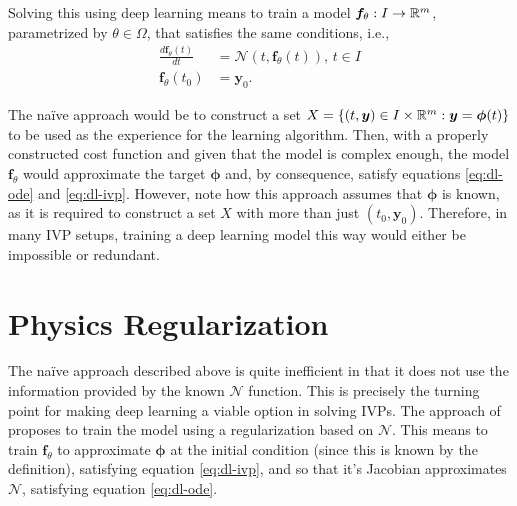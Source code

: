 Solving this using deep learning means to train a model $\bm{f}_{\theta}:I\to \mathbb{R}^{m}$, parametrized by $\theta\in \Omega$, that satisfies the same conditions, i.e.,
\begin{align}
    \frac{d \bm{f}_\theta(t)}{d t} &= \mathcal{N}\left( t, \bm{f}_\theta(t) \right),\,t\in I \label{eq:dl-ode} \\
    \bm{f}_\theta(t_0) &= \bm{y}_0 \label{eq:dl-ivp}
.\end{align}

The naïve approach would be to construct a set $X=\left\{ (t,\bm{y})\in I\times \mathbb{R}^{m}: \bm{y}=\bm{\phi}(t) \right\} $ to be used as the experience for the learning algorithm.
Then, with a properly constructed cost function and given that the model is complex enough, the model $\bm{f}_\theta$ would approximate the target $\bm{\phi}$ and, by consequence, satisfy equations \eqref{eq:dl-ode} and \eqref{eq:dl-ivp}.
However, note how this approach assumes that $\bm{\phi}$ is known, as it is required to construct a set $X$ with more than just $\left( t_0,\bm{y}_0 \right) $.
Therefore, in many \gls{IVP} setups, training a deep learning model this way would either be impossible or redundant.

\section{Physics Regularization}

The naïve approach described above is quite inefficient in that it does not use the information provided by the known $\mathcal{N}$ function.
This is precisely the turning point for making deep learning a viable option in solving \gls{IVP}s.
The approach of \textcite{Raissi2019} proposes to train the model using a regularization based on $\mathcal{N}$.
This means to train $\bm{f}_\theta$ to approximate $\bm{\phi}$ at the initial condition (since this is known by the definition), satisfying equation \eqref{eq:dl-ivp}, and so that it's Jacobian approximates $\mathcal{N}$, satisfying equation \eqref{eq:dl-ode}.

